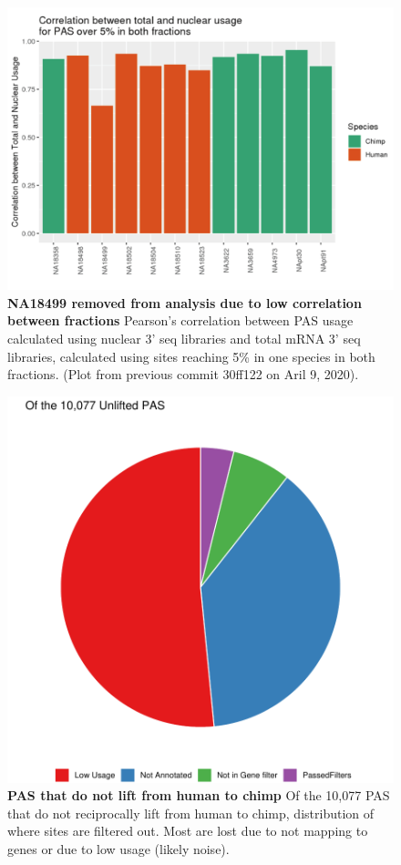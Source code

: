 \begin{figure}[!htb]
\centering
\includegraphics[width=5in]{img/ch03/Fig1_figSup11.pdf}
\caption[NA18499 removed from analysis due to low correlation between fractions]{\textbf{NA18499 removed from analysis due to low correlation between fractions} Pearson's correlation between PAS usage calculated using nuclear 3' seq libraries and total mRNA 3' seq libraries, calculated using sites reaching 5\% in one species in both fractions. (Plot from previous commit 30ff122 on Aril 9, 2020). }
\label{fig:ch03-removeInd}
\end{figure}
\clearpage

\begin{figure}[!htb]
\centering
\includegraphics[width=5in]{img/ch03/Fig2-figSup8.pdf}
\caption[PAS that do not lift from human to chimp]{\textbf{PAS that do not lift from human to chimp} Of the 10,077 PAS that do not reciprocally lift from human to chimp, distribution of where sites are filtered out. Most are lost due to not mapping to genes or due to low usage (likely noise). }
\label{fig:ch03-unlift}
\end{figure}
\clearpage

